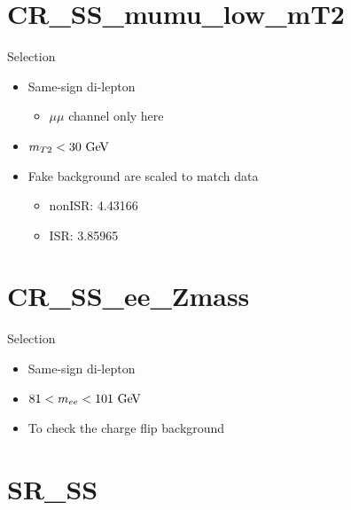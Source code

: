 \documentclass[mathserif,serif]{beamer}
\begin{document}
%
%

\section{CR\_SS\_mumu\_low\_mT2}
\begin{frame}
\sectionpage
\end{frame}

\begin{frame}{Selection}
\begin{itemize}
\item Same-sign di-lepton
\begin{itemize}
\item $\mu\mu$ channel only here
\end{itemize}
\item $m_{T2}<30\GeV$
\item Fake background are scaled to match data
\begin{itemize}
\item nonISR: 4.43166
\item ISR: 3.85965
\end{itemize}
\end{itemize}
\end{frame}

%
%

\section{CR\_SS\_ee\_Zmass}
\begin{frame}
\sectionpage
\end{frame}

\begin{frame}{Selection}
\begin{itemize}
\item Same-sign di-lepton
\item $81<m_{ee}<101\GeV$
\item To check the charge flip background
\end{itemize}
\end{frame}

%
%

\section{SR\_SS}
\begin{frame}
\sectionpage
\end{frame}
\end{document}
